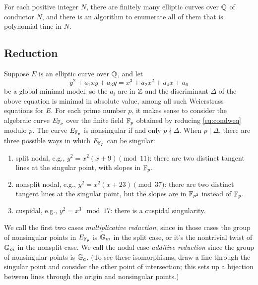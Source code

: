 \documentclass{book}
\begin{document}
\begin{theorem}
For each positive integer $N$,
there are finitely many elliptic curves over $\mathbb{Q}$
of conductor $N$, and there is an algorithm
to enumerate all of them that is polynomial
time in $N$.
\end{theorem}

\subsection{Reduction}
Suppose $E$ is an elliptic curve over $\mathbb{Q}$, and let
\begin{equation}\label{eq:condweq}
y^2 + a_1 xy + a_3 y = x^3 + a_2 x^2 + a_4 x + a_6
\end{equation}
be a global minimal model, so the $a_i$ are in $\mathbb{Z}$
and the discriminant $\Delta$ of the above equation is minimal
in absolute value, among all such Weierstrass equations for $E$.
For each prime number $p$, it makes sense to consider
the algebraic curve $E_{\mathbb{F}_p}$ over the finite field
$\mathbb{F}_p$ obtained by reducing \eqref{eq:condweq} modulo $p$.
The curve $E_{\mathbb{F}_p}$ is nonsingular if and only $p\nmid \Delta$.
When $p\mid \Delta$, there are three possible ways in which
$E_{\mathbb{F}_p}$ can be singular:
\begin{enumerate}
\item split nodal, e.g., $y^2=x^2(x+9)\pmod{11}$: there are two distinct
tangent lines at the singular point, with slopes in $\mathbb{F}_p$.
\item nonsplit nodal, e.g., $y^2=x^2(x+23) \pmod{37}$: there are two distinct tangent lines
at the singular point, but the slopes are in $\mathbb{F}_{p^2}$ instead
of $\mathbb{F}_p$.
\item cuspidal, e.g., $y^2=x^3\mod{17}$: there is a cuspidal singularity.
\end{enumerate}
We call the first two cases {\em multiplicative reduction}, since in those
cases the group of nonsingular points in $E_{\mathbb{F}_p}$ is $\mathbb{G}_m$ in
the split case, or it's the nontrivial twist of $\mathbb{G}_m$ in the nonsplit case.
We call the nodal case {\em additive reduction} since the group of nonsingular points is $\mathbb{G}_a$.  (To see these isomorphisms, draw a line through the singular point and consider the other point of intersection; this sets up a bijection between lines through the origin and nonsingular points.)
\end{document}
